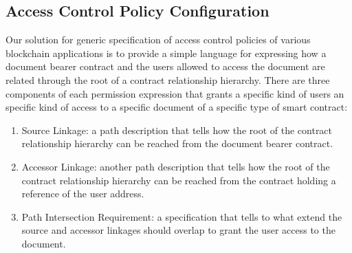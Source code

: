 \documentclass[conference]{IEEEtran}
\begin{document}
\subsection{Access Control Policy Configuration}
Our solution for generic specification of access control policies of various blockchain applications is to provide a simple language for expressing how a document bearer contract and the users allowed to access the document are related through the root of a contract relationship hierarchy. There are three components of each permission expression that grants a specific kind of users an specific kind of access to a specific document of a specific type of smart contract:
\begin{enumerate}
\item Source Linkage: a path description that tells how the root of the contract relationship hierarchy can be reached from the document bearer contract.
\item Accessor Linkage: another path description that tells how the root of the contract relationship hierarchy can be reached from the contract holding a reference of the user address.
\item Path Intersection Requirement: a specification that tells to what extend the source and accessor linkages should overlap to grant the user access to the document.     
\end{enumerate}            
\end{document}
